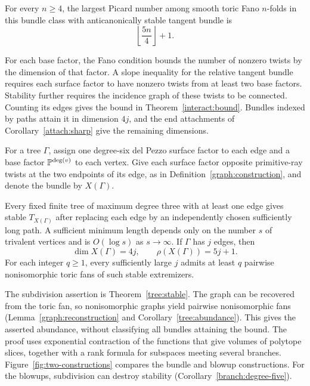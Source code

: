 \begin{theorem}\label{thm:main}\label{thm:bundlebound}
For every $n\ge4$, the largest Picard number among smooth toric Fano
$n$-folds in this bundle class with anticanonically stable tangent
bundle is
\[
 \left\lfloor\frac{5n}{4}\right\rfloor+1.
\]
\end{theorem}

For each base factor, the Fano condition bounds the number of nonzero
twists by the dimension of that factor. A slope inequality for the
relative tangent bundle requires each surface factor to have nonzero
twists from at least two base factors. Stability further requires the
incidence graph of these twists to be connected. Counting its edges
gives the bound in Theorem~\ref{interact:bound}. Bundles indexed by paths
attain it in dimension $4j$, and the end attachments of
Corollary~\ref{attach:sharp} give the remaining dimensions.

For a tree $\Gamma$, assign one degree-six del Pezzo surface factor to
each edge and a base factor $\mathbb{P}^{\deg(v)}$ to each vertex. Give each
surface factor opposite primitive-ray twists at the two endpoints of
its edge, as in Definition~\ref{graph:construction}, and
denote the bundle by $X(\Gamma)$.
\begin{theorem}\label{thm:tree-intro}
Every fixed finite tree of maximum degree three with at least one
edge gives stable $T_{X(\Gamma)}$ after replacing each edge by an
independently chosen sufficiently long path. A sufficient minimum
length depends only on the number $s$ of trivalent vertices and is
$O(\log s)$ as $s\to\infty$. If $\Gamma$ has $j$ edges, then
\[
 \dim X(\Gamma)=4j,\qquad \rho(X(\Gamma))=5j+1.
\]
For each integer $q\ge1$, every sufficiently large $j$ admits at least
$q$ pairwise nonisomorphic toric fans of such stable extremizers.
\end{theorem}

The subdivision assertion is Theorem~\ref{tree:stable}. The graph can
be recovered from the toric fan, so nonisomorphic graphs yield pairwise
nonisomorphic fans (Lemma~\ref{graph:reconstruction} and
Corollary~\ref{tree:abundance}). This gives the asserted abundance,
without classifying all bundles attaining the bound. The proof uses
exponential contraction of the functions that give volumes of polytope
slices, together with a rank formula for subspaces meeting several
branches. Figure~\ref{fig:two-constructions} compares the bundle and
blowup constructions. For the blowups, subdivision can destroy
stability (Corollary~\ref{branch:degree-five}).

